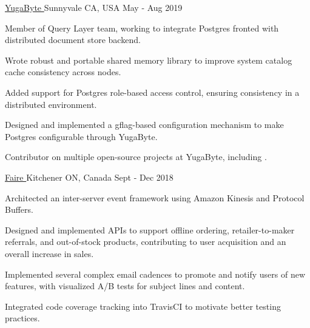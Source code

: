 \begin{cventries}
  {\href{https://www.yugabyte.com}{YugaByte \faExternalLink}} {Sunnyvale CA,
    USA} {May - Aug 2019} {
    \begin{cvitems}
    \item Member of Query Layer team, working to integrate Postgres fronted with
      distributed document store backend.
    \item Wrote robust and portable shared memory library to improve system
      catalog cache consistency across nodes.
    \item Added support for Postgres role-based access control, ensuring
      consistency in a distributed environment.
    \item Designed and implemented a gflag-based configuration mechanism to make
      Postgres configurable through YugaByte.  
    \item Contributor on multiple open-source projects at YugaByte, including
      \thinspace
      \href{https://github.com/YugaByte/yugabyte-db/commits?author=srhickma}{\color[HTML]{3090C7}{yugabyte-db
          \faExternalLink}}.
    \end{cvitems}
  }

  {\href{https://www.faire.com}{Faire \faExternalLink}} {Kitchener ON, Canada}
  {Sept - Dec 2018} {
    \begin{cvitems}
    \item Architected an inter-server event framework using Amazon Kinesis and
      Protocol Buffers.
    \item Designed and implemented APIs to support offline ordering,
      retailer-to-maker referrals, and out-of-stock products, contributing to
      user acquisition and an overall increase in sales.
    \item Implemented several complex email cadences to promote and notify users
      of new features, with visualized A/B tests for subject lines and content.
       
    \item Integrated code coverage tracking into TravisCI to motivate better
      testing practices.
    \end{cvitems}
  }
    

\end{cventries}
